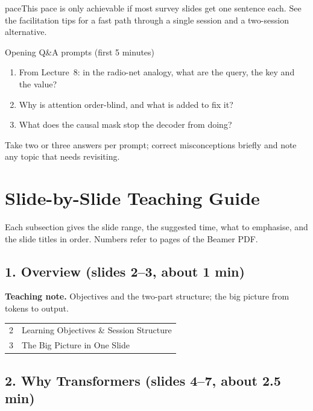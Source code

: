 \documentclass[11pt]{article}
\begin{document}
\begin{pitfall}{pace}This pace is only achievable if most survey slides get one sentence each. See the facilitation tips for a fast path through a single session and a two-session alternative.\end{pitfall}

\begin{instr}{Opening Q\&A prompts (first 5 minutes)}\begin{enumerate}\item From Lecture~8: in the radio-net analogy, what are the query, the key and the value?\item Why is attention order-blind, and what is added to fix it?\item What does the causal mask stop the decoder from doing?\end{enumerate}Take two or three answers per prompt; correct misconceptions briefly and note any topic that needs revisiting.\end{instr}

\section{Slide-by-Slide Teaching Guide}

Each subsection gives the slide range, the suggested time, what to emphasise, and the slide titles in order. Numbers refer to pages of the Beamer PDF.

\subsection{1. Overview \normalfont\small\color{GreyN}(slides 2--3, about 1 min)}

\textbf{Teaching note.} Objectives and the two-part structure; the big picture from tokens to output.

\begin{center}\small\renewcommand{\arraystretch}{1.1}\begin{tabularx}{\textwidth}{@{}r X@{}}2 & Learning Objectives \& Session Structure\\
3 & The Big Picture in One Slide\\\end{tabularx}\end{center}

\subsection{2. Why Transformers \normalfont\small\color{GreyN}(slides 4--7, about 2.5 min)}
\end{document}

